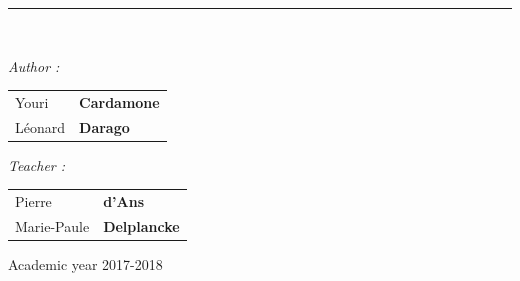 \documentclass[12pt,a4paper]{article}
\newcommand\HRule{\rule{\textwidth}{1pt}}
\begin{document}
\begin{titlepage}
\begin{center}
\HRule \\[0.5cm]%





\begin{minipage}{0.45\textwidth}
\begin{flushleft} \large
\begin{doublespace}
\emph{Author : }\\
\end{doublespace}
\begin{tabular}{ll}
Youri&\textbf{Cardamone}\\
Léonard &\textbf{Darago}\\

\end{tabular}
\end{flushleft}
\end{minipage}
\begin{minipage}{0.45\textwidth}
\begin{flushleft} \large
\begin{doublespace}
\emph{Teacher : }\\ %
\end{doublespace}
\begin{tabular}{ll} 
Pierre &\textbf{d'Ans}\\
Marie-Paule&\textbf{Delplancke}


\end{tabular}
\end{flushleft}
\end{minipage}

\vfill

{\large Academic year 2017-2018}\\


\end{center}

\end{titlepage} 
\end{document}
